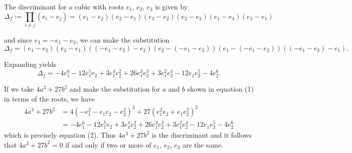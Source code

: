 \documentclass{amsart}
\begin{document}
	The discriminant for a cubic with roots $e_1$, $e_2$, $e_3$ is given by
	$$ \Delta_f := \prod_{i\neq j} (e_i - e_j) = (e_1 - e_2)(e_2 - e_1)(e_3 - e_2)(e_2 - e_3)(e_1 - e_3)(e_3 - e_1) $$
	
	and since $e_3 = - e_1 - e_2$, we can make the substitution
	$$ \Delta_f = (e_1 - e_2)(e_2 - e_1)((-e_1-e_2) - e_2)(e_2 - (-e_1-e_2))(e_1 - (-e_1-e_2))((-e_1-e_2) - e_1) . $$
	
	Expanding yields
	\begin{equation}
	\Delta_f = -4 e_1^6 - 12 e_1^5 e_2 + 3 e_1^4 e_2^2 + 26 e_1^3 e_2^3 + 3 e_1^2 e_2^4 - 12 e_1 e_2^5 - 4 e_2^6 .
	\end{equation}
	
	If we take $4a^3 + 27b^2$ and make the substitution for $a$ and $b$ shown in equation (1) in terms of the roots, we have
	\begin{equation*}
	\begin{split}
	4 a^3 + 27 b^2 & = 4 (-e_1^2 - e_1e_2 - e_2^2)^3 + 27 (e_1^2e_2 + e_1e_2^2)^2 \\
	&= -4 e_1^6 - 12 e_1^5 e_2 + 3 e_1^4 e_2^2 + 26 e_1^3 e_2^3 + 3 e_1^2 e_2^4 - 12 e_1 e_2^5 - 4 e_2^6
	\end{split}
	\end{equation*}
	which is precisely equation (2). Thus $4a^3 + 27b^2$ is the discriminant and it follows that $4a^3 + 27b^2 = 0$ if and only if two or more of $e_1$, $e_2$, $e_3$ are the same.
	
\end{document}
